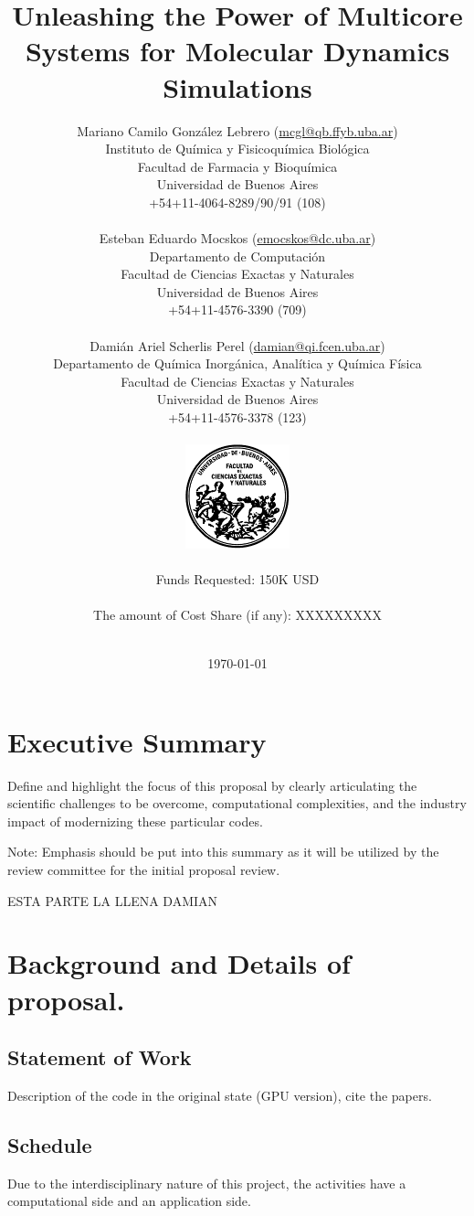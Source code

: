 \documentclass[a4paper,10pt]{article}
\title{\Huge Unleashing the Power of Multicore Systems for Molecular Dynamics Simulations}
\author{{\Large Mariano Camilo Gonz\'alez Lebrero} (\url{mcgl@qb.ffyb.uba.ar})\\
Instituto de Qu\'imica y Fisicoqu\'imica Biol\'ogica\\
Facultad de Farmacia y Bioqu\'imica\\
Universidad de Buenos Aires \\
+54+11-4064-8289/90/91 (108)\\
\\ 
{\Large Esteban Eduardo Mocskos} (\url{emocskos@dc.uba.ar})\\
Departamento de Computaci\'on\\
Facultad de Ciencias Exactas y Naturales\\
Universidad de Buenos Aires\\
+54+11-4576-3390 (709)\\
\\ 
{\Large Dami\'an Ariel Scherlis Perel} (\url{damian@qi.fcen.uba.ar})\\
Departamento de Qu\'imica Inorg\'anica, Anal\'itica y Qu\'imica F\'isica\\
Facultad de Ciencias Exactas y Naturales\\
Universidad de Buenos Aires\\
+54+11-4576-3378 (123)\\
\\
\includegraphics[keepaspectratio, width=3cm]{logofcen.pdf}\\
\\
Funds Requested: 150K USD \\
\\
The amount of Cost Share (if any): XXXXXXXXX\\
\\
}
\date{\today }
\begin{document}
\maketitle

\newpage

\section{Executive Summary}
Define and highlight the focus of this proposal by clearly articulating the scientific challenges to be overcome, computational complexities, and the industry impact of modernizing these particular codes. 

Note: Emphasis should be put into this summary as it will be utilized by the review committee
for the initial proposal review.

ESTA PARTE LA LLENA DAMIAN


\newpage

\section{Background and Details of proposal.}

\subsection{Statement of Work}
Description of the code in the original state (GPU version), cite the papers. 

\subsection{Schedule} 

Due to the interdisciplinary nature of this project, the activities have a computational side and an application side.
\end{document}
